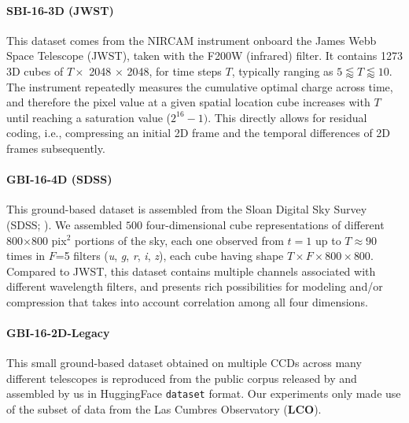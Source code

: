 \paragraph{SBI-16-3D (JWST)}
This dataset comes from the NIRCAM instrument onboard the James Webb Space Telescope (JWST), taken with the F200W (infrared) filter. It contains 1273 3D cubes of $T \times$ 2048 $\times$ 2048, for time steps $T$, typically ranging as $5 \lessapprox T \lessapprox 10$.
The instrument repeatedly measures the cumulative optimal charge across time, and therefore the pixel value at a given spatial location cube increases with $T$ until reaching a saturation value ($2^{16} - 1)$. This directly allows for residual coding, i.e., compressing an initial 2D frame and the temporal differences of 2D frames subsequently.

\paragraph{GBI-16-4D (SDSS)}
This ground-based dataset is assembled from the Sloan Digital Sky Survey (SDSS; \citealt{2000AJ....120.1579Y}). We assembled $500$ four-dimensional cube representations of different 800$\times$800 pix$^2$ portions of the sky, each one observed from $t=1$ up to $T \approx 90$ times in $F$=5 filters ({\it u}, {\it g}, {\it r}, {\it i}, {\it z}), each cube having shape $T \times F \times 800 \times 800$.
Compared to JWST, this dataset contains multiple channels associated with different wavelength filters, and presents rich possibilities for modeling and/or compression that takes into account correlation among all four dimensions. 

\paragraph{GBI-16-2D-Legacy}
This small ground-based dataset obtained on multiple CCDs across many different telescopes is reproduced from the public corpus released by  \citet{maireles2023efficient} and assembled by us in HuggingFace \texttt{dataset} format. Our experiments only made use of the subset of data from the Las Cumbres Observatory (\textbf{LCO}). 

